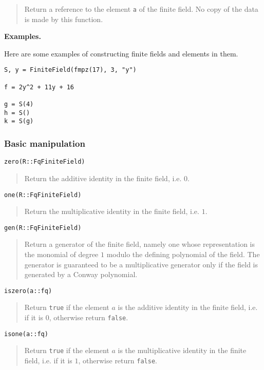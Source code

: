 \documentclass[a4paper,10pt]{article}
\newcommand{\code}{\lstinline}
\newcommand{\desc}[1]{\vspace{-3mm}\begin{quote}#1\end{quote}}
\begin{document}
{{\desc{Return a reference to the element \code{a} of the finite field. No copy
of the data is made by this function.}

\textbf{Examples.}

Here are some examples of constructing finite fields and elements in them.

\begin{lstlisting}
S, y = FiniteField(fmpz(17), 3, "y")

f = 2y^2 + 11y + 16

g = S(4)
h = S()
k = S(g)
\end{lstlisting}

\subsubsection{Basic manipulation}

\begin{lstlisting}
zero(R::FqFiniteField)
\end{lstlisting}

\desc{Return the additive identity in the finite field, i.e. $0$.}

\begin{lstlisting}
one(R::FqFiniteField)
\end{lstlisting}

\desc{Return the multiplicative identity in the finite field, i.e. $1$.}

\begin{lstlisting}
gen(R::FqFiniteField)
\end{lstlisting}

\desc{Return a generator of the finite field, namely one whose
representation is the monomial of degree $1$ modulo the defining
polynomial of the field. The generator is guaranteed to be a multiplicative 
generator only if the field is generated by a Conway polynomial.}

\begin{lstlisting}
iszero(a::fq)
\end{lstlisting}

\desc{Return \code{true} if the element $a$ is the additive identity in the
finite field, i.e. if it is $0$, otherwise return \code{false}.}

\begin{lstlisting}
isone(a::fq)
\end{lstlisting}

\desc{Return \code{true} if the element $a$ is the multiplicative identity in
the finite field, i.e. if it is $1$, otherwise return \code{false}.}

}}
\end{document}

